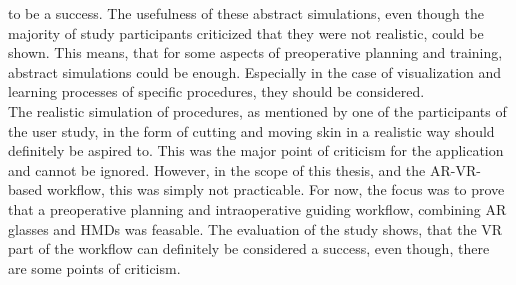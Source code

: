 to be a success. The usefulness of these abstract simulations, even
though the majority of study participants criticized that they 
were not realistic, could be shown. This means, that for some 
aspects of preoperative planning and training, abstract 
simulations could be enough. Especially in the case of visualization and 
learning processes of specific procedures, they should be considered.
\\ The realistic simulation of procedures, as mentioned by one of 
the participants of the user study, in the form of cutting and moving
skin in a realistic way should definitely be aspired to. This 
was the major point of criticism for the application and cannot
be ignored. However, in the scope of this thesis, and the AR-VR-based
workflow, this was simply not practicable. For now, the focus was to
prove that a preoperative planning and intraoperative guiding workflow, combining
AR glasses and HMDs was feasable. The evaluation of the study shows,
that the VR part of the workflow can definitely be considered a success, 
even though, there are some points of criticism.
